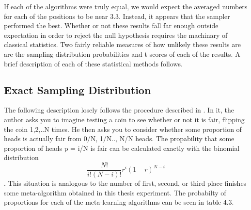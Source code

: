 If each of the algorithms were truly equal, we would expect the averaged numbers
for each of the positions to be near 3.3. Instead, it appears that the sampler
performed the best. Whether or not these results fall far enough outside
expectation in order to reject the null hypothesis requires the machinary of
classical statistics. Two fairly reliable measures of how unlikely these results
are are the sampling distribution probabilities and t scores of each of the
results. A brief description of each of these statistical methods follows.

\subsection{Exact Sampling Distribution}
The following description losely follows the procedure described in \cite{Cohen}.
In it, the author asks you to imagine testing a coin to see whether or not it
is fair, flipping the coin 1,2,..N times. He then asks you to consider whether
some proportion of heads is actually fair from 0/N, 1/N.., N/N heads. The
propability that some proportion of heads p = i/N is fair can be calculated
exactly with the binomial distribution $$\frac{N!}{i!(N-i)!}r^{i}(1-r)^{N-i}$$.
This situation is analogous to the number of first, second, or third place
finishes some meta-algorithm obtained in this thesis experiment. The probabilty
of proportions for each of the meta-learning algorithms can be seen in table 4.3.

